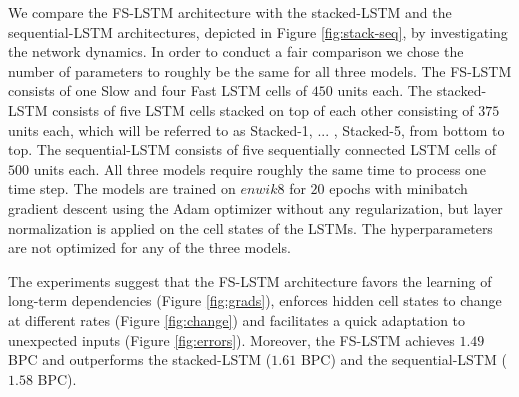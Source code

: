 \documentclass{article}
\begin{document}
 We compare the FS-LSTM architecture with the stacked-LSTM  and the sequential-LSTM architectures,  depicted in Figure \ref{fig:stack-seq}, by investigating the network dynamics.  In order to conduct a fair comparison we chose the number of parameters to roughly be the same for all three models. The  FS-LSTM consists of  one Slow and four Fast LSTM cells of $450$ units each. The stacked-LSTM consists of five LSTM cells stacked on top of each other consisting of $375$ units each, which will be referred to as Stacked-1, ... , Stacked-5, from bottom to top. The sequential-LSTM consists of five sequentially connected LSTM cells of $500$ units each. All three models require roughly the same time to process one time step. The models are trained on $enwik8$ for $20$ epochs with minibatch gradient descent using the Adam optimizer \cite{kingma14adam} without any regularization, but layer normalization \cite{ba16layernorm} is applied on the cell states of the LSTMs. The hyperparameters are not optimized for any of the three models. 
 
 The experiments suggest that the FS-LSTM architecture favors the learning of long-term dependencies (Figure \ref{fig:grads}), enforces hidden cell states to change at different rates (Figure \ref{fig:change}) and facilitates a quick adaptation to unexpected inputs (Figure \ref{fig:errors}). Moreover,  the FS-LSTM achieves  $1.49$ BPC and outperforms the stacked-LSTM ($1.61$ BPC) and the sequential-LSTM ($1.58$ BPC).
 

 
\end{document}
